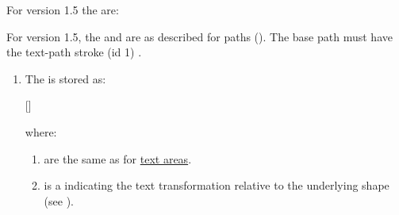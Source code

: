 \begin{numbered}
\begin{enumerate}
  For version 1.5 the  are:
  \begin{jdrversion}{1.5}
  \begin{syntaxline}
    
  \end{syntaxline}
  For version 1.5, the  and  are as described
  for paths (\hyperref[jdr:path]{}). The base path must have the
  text-path stroke (id 1) \hyperref[jdr:pathstyle]{}.
  \end{jdrversion}

    \begin{enumerate}%

    \item\label{jdr:textpathstroke} The  is
    stored as:
    \begin{syntaxline}
      
    [] 
    \end{syntaxline}
    where:
      \begin{enumerate}
      \item {} are the same as for
      \hyperref[jdr:textarea]{text areas}.

      \item {} is a  indicating the
      text transformation relative to the underlying shape (see
      ).


\end{enumerate}
\end{enumerate}
\end{enumerate}
\end{numbered}
